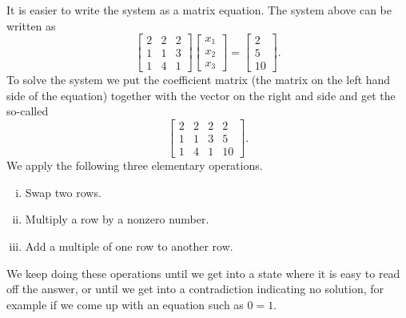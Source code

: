 It is easier to write the system as a matrix equation.
The system above can be
written as
\begin{equation*}
\begin{bmatrix}
2 & 2 & 2 \\
1 & 1 & 3 \\
1 & 4 & 1 
\end{bmatrix}
\begin{bmatrix}
x_1 \\
x_2 \\
x_3
\end{bmatrix} 
=
\begin{bmatrix}
2 \\
5 \\
10
\end{bmatrix} .
\end{equation*}
To solve the system we put the coefficient matrix (the matrix on the left
hand side of the equation) together with the vector on the right and side
and get the
so-called
\emph{}
\begin{equation*}
\left[
\begin{array}{ccc|c}
2 & 2 & 2 & 2 \\
1 & 1 & 3 & 5 \\
1 & 4 & 1 & 10
\end{array}
\right] .
\end{equation*}
We apply the following three elementary operations.
\begin{enumerate}[(i)]
\item Swap two rows.
\item Multiply a row by a nonzero number.
\item Add a multiple of one row to another row.
\end{enumerate}
We keep doing these operations until we get into a state where it is
easy to read off the answer, or until we get into a contradiction indicating
no solution, for example if we come up with an equation such as $0=1$.

